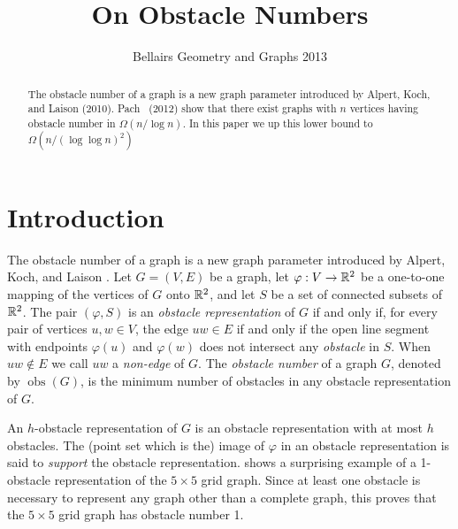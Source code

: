 \documentclass{patmorin}
\title{On Obstacle Numbers}
\author{Bellairs Geometry and Graphs 2013}
\DeclareMathOperator{\obs}{obs}
\begin{document}
\maketitle

\begin{abstract}
The obstacle number of a graph is a new graph parameter
introduced by Alpert, Koch, and Laison (2010).  Pach \etal\ (2012)
show that there exist graphs with $n$ vertices having obstacle
number in $\Omega(n/\log n)$. In this paper we up this lower bound to
$\Omega(n/(\log\log n)^2)$
\end{abstract}

\newpage

\section{Introduction}

The obstacle number of a graph is a new graph parameter introduced by
Alpert, Koch, and Laison \cite{alpert.koch.ea:obstacle}.  Let $G=(V,E)$ be
a graph, let $\varphi:V\to \mathbb{R}^2$ be a one-to-one mapping of the vertices
of $G$ onto $\mathbb{R}^2$, and let $S$ be a set of connected subsets of $\mathbb{R}^2$.
The pair $(\varphi,S)$ is an \emph{obstacle representation} of $G$ if and
only if, for every pair of vertices $u,w\in V$, the edge $uw\in E$ if and
only if the open line segment with endpoints $\varphi(u)$ and $\varphi(w)$
does not intersect any \emph{obstacle} in $S$.  When $uw\not\in E$
we call $uw$ a \emph{non-edge} of $G$. The \emph{obstacle number} of a
graph $G$, denoted by $\obs(G)$, is the minimum number of obstacles in
any obstacle representation of $G$.

An $h$-obstacle representation of $G$ is an obstacle representation with
at most $h$ obstacles.  The (point set which is the) image of $\varphi$
in an obstacle representation is said to \emph{support} the obstacle
representation.   shows a surprising example of a
1-obstacle representation of the $5\times 5$ grid graph.  Since at least
one obstacle is necessary to represent any graph other than a complete
graph, this proves that the $5\times 5$ grid graph has obstacle number 1.
\end{document}
